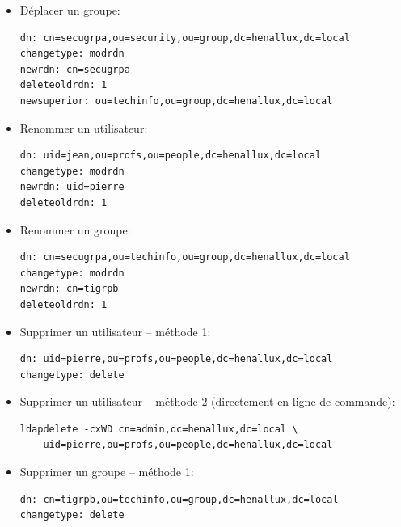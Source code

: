 \documentclass[a4paper]{article}
\begin{document}
\begin{itemize}
\item Déplacer un groupe:
\begin{example} \begin{verbatim}
dn: cn=secugrpa,ou=security,ou=group,dc=henallux,dc=local
changetype: modrdn
newrdn: cn=secugrpa
deleteoldrdn: 1
newsuperior: ou=techinfo,ou=group,dc=henallux,dc=local
\end{verbatim} \end{example}


\item Renommer un utilisateur:
\begin{example} \begin{verbatim}
dn: uid=jean,ou=profs,ou=people,dc=henallux,dc=local
changetype: modrdn
newrdn: uid=pierre
deleteoldrdn: 1
\end{verbatim} \end{example}


\item Renommer un groupe:
\begin{example} \begin{verbatim}
dn: cn=secugrpa,ou=techinfo,ou=group,dc=henallux,dc=local
changetype: modrdn
newrdn: cn=tigrpb
deleteoldrdn: 1
\end{verbatim} \end{example}


\item Supprimer un utilisateur -- méthode 1:
\begin{example} \begin{verbatim}
dn: uid=pierre,ou=profs,ou=people,dc=henallux,dc=local
changetype: delete
\end{verbatim} \end{example}


\item Supprimer un utilisateur -- méthode 2 (directement en ligne de commande): \\
\begin{verbatim}
ldapdelete -cxWD cn=admin,dc=henallux,dc=local \
    uid=pierre,ou=profs,ou=people,dc=henallux,dc=local
\end{verbatim}


\item Supprimer un groupe -- méthode 1:
\begin{example} \begin{verbatim}
dn: cn=tigrpb,ou=techinfo,ou=group,dc=henallux,dc=local
changetype: delete
\end{verbatim} \end{example}



\end{itemize}
\end{document}
